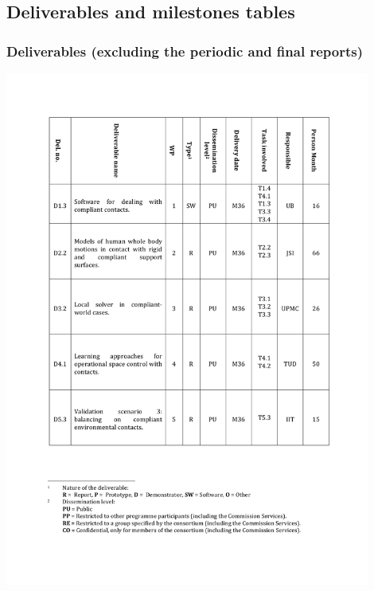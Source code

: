 \documentclass[12pt,a4paper,twoside]{article}
\begin{document}
\subsection{Deliverables and milestones tables}
\subsubsection{Deliverables (excluding the periodic and final reports)}
{\centering \includegraphics[width=0.9\textwidth]{./images/deliverables.pdf}}
\end{document}
